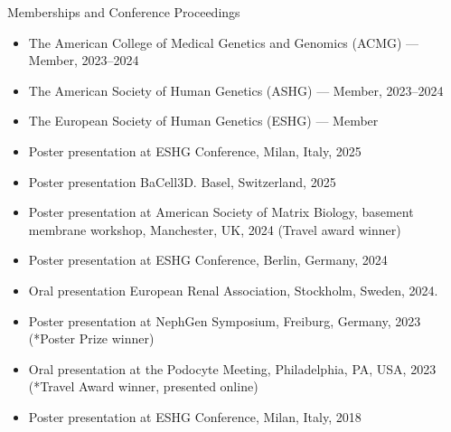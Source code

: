 \documentclass[
	11pt, %
]{resume} %
\begin{document}
\begin{rSection}{Memberships and Conference Proceedings}

\begin{itemize}
  \item The American College of Medical Genetics and Genomics (ACMG) — Member, 2023–2024
  \item The American Society of Human Genetics (ASHG) — Member, 2023–2024
  \item The European Society of Human Genetics (ESHG) — Member
  \item Poster presentation at ESHG Conference, Milan, Italy, 2025
  \item Poster presentation BaCell3D. Basel, Switzerland, 2025
  \item Poster presentation at American Society of Matrix Biology, basement membrane workshop, Manchester, UK, 2024 (Travel award winner) 
  \item Poster presentation at ESHG Conference, Berlin, Germany, 2024
  \item Oral presentation European Renal Association, Stockholm, Sweden, 2024. 
  \item Poster presentation at NephGen Symposium, Freiburg, Germany, 2023 (*Poster Prize winner)
  \item Oral presentation at the Podocyte Meeting, Philadelphia, PA, USA, 2023 (*Travel Award winner, presented online)
  \item Poster presentation at ESHG Conference, Milan, Italy, 2018
\end{itemize}

\end{rSection}


\end{document}
